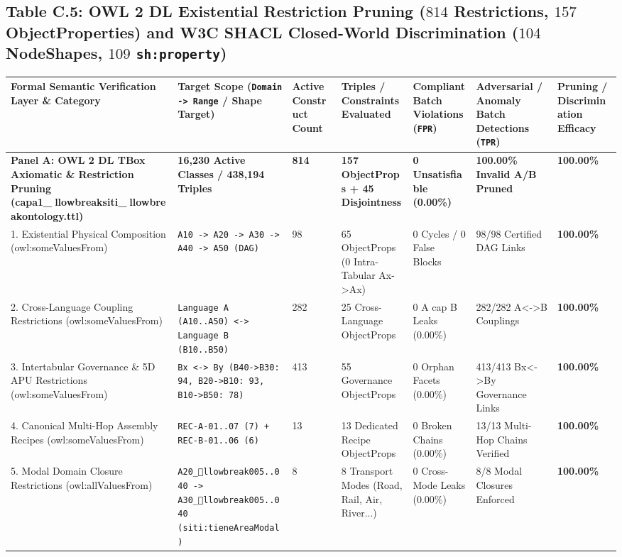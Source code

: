 \documentclass[10pt,a4paper]{article}
\begin{document}
\subsection*{Table C.5: OWL 2 DL Existential Restriction Pruning ($814$ Restrictions, $157$ ObjectProperties) and W3C SHACL Closed-World Discrimination ($104$ NodeShapes, $109$ \texttt{sh:property})}

{\scriptsize
\begin{longtable}{p{}p{}p{}p{}p{}p{}p{}}
\toprule
\textbf{Formal Semantic Verification Layer \& Category} & \textbf{Target Scope (\texttt{Domain -> Range} / Shape Target)} & \textbf{Active Construct Count} & \textbf{Triples / Constraints Evaluated} & \textbf{Compliant Batch Violations (\texttt{FPR})} & \textbf{Adversarial / Anomaly Batch Detections (\texttt{TPR})} & \textbf{Pruning / Discrimination Efficacy} \\
\midrule
\endhead
\textbf{Panel A: OWL 2 DL TBox Axiomatic \& Restriction Pruning (capa1\_llowbreak{}siti\_llowbreak{}ontology.ttl)} & \textbf{16,230 Active Classes / 438,194 Triples} & \textbf{814} & \textbf{157 ObjectProps + 45 Disjointness} & \textbf{0 Unsatisfiable (0.00\%)} & \textbf{100.00\% Invalid A/B Pruned} & \textbf{100.00\%} \\
1. Existential Physical Composition (owl:someValuesFrom) & \texttt{A10 -> A20 -> A30 -> A40 -> A50 (DAG)} & 98 & 65 ObjectProps (0 Intra-Tabular Ax->Ax) & 0 Cycles / 0 False Blocks & 98/98 Certified DAG Links & \textbf{100.00\%} \\
2. Cross-Language Coupling Restrictions (owl:someValuesFrom) & \texttt{Language A (A10..A50) <-> Language B (B10..B50)} & 282 & 25 Cross-Language ObjectProps & 0 A cap B Leaks (0.00\%) & 282/282 A<->B Couplings & \textbf{100.00\%} \\
3. Intertabular Governance \& 5D APU Restrictions (owl:someValuesFrom) & \texttt{Bx <-> By (B40->B30: 94, B20->B10: 93, B10->B50: 78)} & 413 & 55 Governance ObjectProps & 0 Orphan Facets (0.00\%) & 413/413 Bx<->By Governance Links & \textbf{100.00\%} \\
4. Canonical Multi-Hop Assembly Recipes (owl:someValuesFrom) & \texttt{REC-A-01..07 (7) + REC-B-01..06 (6)} & 13 & 13 Dedicated Recipe ObjectProps & 0 Broken Chains (0.00\%) & 13/13 Multi-Hop Chains Verified & \textbf{100.00\%} \\
5. Modal Domain Closure Restrictions (owl:allValuesFrom) & \texttt{A20\_llowbreak{}005..040 -> A30\_llowbreak{}005..040 (siti:tieneAreaModal)} & 8 & 8 Transport Modes (Road, Rail, Air, River...) & 0 Cross-Mode Leaks (0.00\%) & 8/8 Modal Closures Enforced & \textbf{100.00\%} \\

\end{longtable}}
\end{document}
